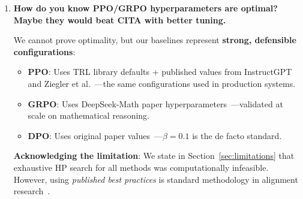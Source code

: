 \begin{enumerate}[label=\textbf{Q\arabic*.}, leftmargin=*, itemsep=8pt]
\begin{enumerate}[leftmargin=*,itemsep=2pt]
    \item \textbf{CITA/DPO are offline}: Pre-computed preference pairs enable single forward-backward passes without generation overhead.

    \item \textbf{Same hardware, same epochs}: All methods trained on identical A100-40GB with comparable epoch counts. Time difference is algorithmic, not resource allocation.

    \item \textbf{Efficiency is a feature}: If CITA achieves 95.6\% efficiency in 2h while PPO achieves 50.4\% in 17h, that's a \textit{practical advantage}, not a confound.
\end{enumerate}

\textbf{Fair comparison metric}: Results are measured on \textit{held-out benchmarks} after training completes. Training time affects reproducibility cost, not evaluation validity.

\vspace{4mm}

\item \textbf{How do you know PPO/GRPO hyperparameters are optimal? Maybe they would beat CITA with better tuning.}

 We cannot prove optimality, but our baselines represent \textbf{strong, defensible configurations}:

\begin{itemize}[leftmargin=*,itemsep=2pt]
    \item \textbf{PPO}: Uses TRL library defaults + published values from InstructGPT~\cite{ouyang2022training} and Ziegler et al.~\cite{ziegler2019fine}---the same configurations used in production systems.

    \item \textbf{GRPO}: Uses DeepSeek-Math paper hyperparameters~\cite{shao2024deepseekmath}---validated at scale on mathematical reasoning.

    \item \textbf{DPO}: Uses original paper values~\cite{rafailov2023direct}---$\beta=0.1$ is the de facto standard.
\end{itemize}

\textbf{Acknowledging the limitation}: We state in Section~\ref{sec:limitations} that exhaustive HP search for all methods was computationally infeasible. However, using \textit{published best practices} is standard methodology in alignment research~\cite{ouyang2022training,bai2022training}.


\end{enumerate}
